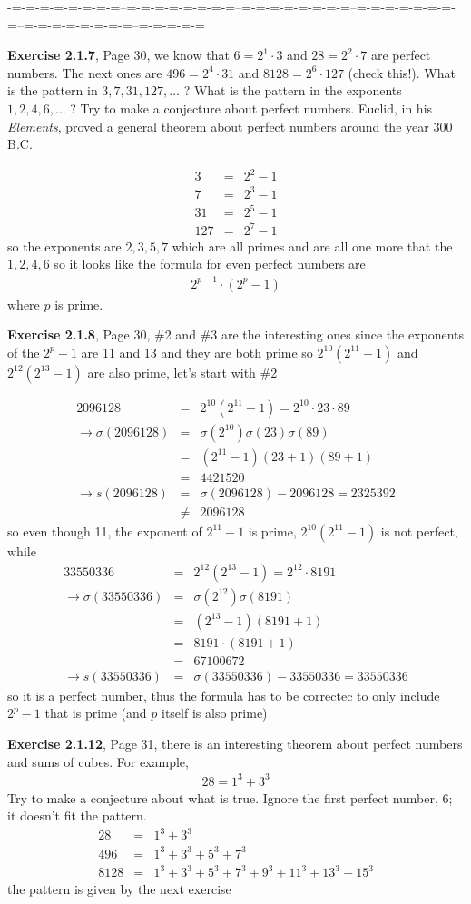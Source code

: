 \documentclass[aps,preprint,preprintnumbers,nofootinbib,showpacs,prd]{revtex4-1}
\newcommand{\nbea}{\begin{eqnarray*}}
\newcommand{\neea}{\end{eqnarray*}}
\begin{document}
-=-=-=-=-=-=-=-=--=-=-=-=-=-=-=-=--=-=-=-=-=-=-=-=--=-=-=-=-=-=-=-=--=-=-=-=-=-=-=-=--=-=-=-=-=

{\bf Exercise 2.1.7}, Page 30, we know that $6=2^1\cdot3$ and $28=2^2\cdot 7$ are perfect numbers. The next ones are $496=2^4\cdot31$ and $8128=2^6\cdot127$ (check this!). What is the pattern in $3,7,31,127,\ldots$ ? What is the pattern in the exponents $1,2,4,6,\ldots$ ? Try to make a conjecture about perfect numbers. Euclid, in his {\it Elements}, proved a general theorem about perfect numbers around the year 300 B.C.

%
\nbea
3 & = & 2^2 - 1 \\
7 & = & 2^3 - 1 \\
31 & = & 2^5 - 1\\
127 & = & 2^7 - 1
\neea
%
so the exponents are $2,3,5,7$ which are all primes and are all one more that the $1,2,4,6$ so it looks like the formula for even perfect numbers are
%
\nbea
2^{p-1}\cdot (2^p - 1)
\neea
%
where $p$ is prime.

{\bf Exercise 2.1.8}, Page 30, \#2 and \#3 are the interesting ones since the exponents of the $2^p-1$ are 11 and 13 and they are both prime so $2^{10}(2^{11}-1)$ and $2^{12}(2^{13}-1)$ are also prime, let's start with \#2

%
\nbea
2096128 & = & 2^{10}(2^11-1) = 2^{10}\cdot 23 \cdot 89 \\
\to \sigma(2096128) & = & \sigma(2^{10}) \sigma(23) \sigma(89) \\
& = & (2^11-1) (23+1)(89+1) \\
& = & 4421520 \\
\to s(2096128) & = & \sigma(2096128) - 2096128  = 2325392\\
& \neq & 2096128
\neea
%
so even though 11, the exponent of $2^{11}-1$ is prime, $2^{10}(2^{11}-1)$ is not perfect, while
%
\nbea
33550336 & = & 2^{12}(2^{13}-1) = 2^{12} \cdot 8191 \\
\to \sigma(33550336) & = & \sigma(2^{12})\sigma(8191) \\
& = & (2^{13}-1)(8191+1) \\
& = & 8191\cdot(8191+1) \\
& = & 67100672 \\
\to s(33550336) & = & \sigma(33550336) - 33550336 = 33550336
\neea
%
so it is a perfect number, thus the formula has to be correctec to only include $2^p-1$ that is prime (and $p$ itself is also prime)

{\bf Exercise 2.1.12}, Page 31, there is an interesting theorem about perfect numbers and sums of cubes. For example,
%
\nbea
28 = 1^3 + 3^3
\neea
%
Try to make a conjecture about what is true. Ignore the first perfect number, 6; it doesn't fit the pattern.
%
\nbea
28 & = & 1^3 + 3^3\\
496 & = & 1^3 + 3^3 + 5^3 + 7^3\\
8128 & = & 1^3 + 3^3 + 5^3 + 7^3 + 9^3 + 11^3 + 13^3 + 15^3
\neea
%
the pattern is given by the next exercise
\end{document}
